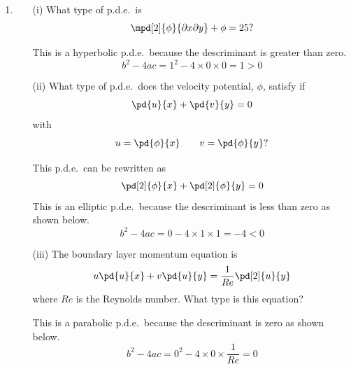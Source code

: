 \documentclass[11pt, oneside]{article}
\begin{document}
\begin{enumerate}
\begin{enumerate}
\begin{center}
        \end{center}
    \end{enumerate}

  \item %
    \begin{enumerate}
      \item[(i)] %
        What type of p.d.e.\ is
        \[
          \mpd[2]{\phi}{\partial x \partial y} + \phi = 25?
        \]

        This is a hyperbolic p.d.e.\ because the descriminant is
        greater than zero.
        \[
          b^2 - 4ac = 1^2 - 4 \times 0 \times 0 = 1 > 0
        \]

      \item[(ii)] %
        What type of p.d.e.\ does the velocity potential, $\phi$, satisfy if
        \[
          \pd{u}{x} + \pd{v}{y} = 0
        \]
        with
        \[
          u = \pd{\phi}{x} \qquad v = \pd{\phi}{y}?
        \]

        This p.d.e.\ can be rewritten as
        \[
          \pd[2]{\phi}{x} + \pd[2]{\phi}{y} = 0
        \]
        This is an elliptic p.d.e.\ because the descriminant is less than zero
        as shown below.
        \[
          b^2 - 4ac = 0 - 4\times 1 \times 1 = -4 < 0
        \]

      \item[(iii)] %
        The boundary layer momentum equation is
        \[
          u \pd{u}{x} + v \pd{u}{y} = \frac{1}{Re} \pd[2]{u}{y}
        \]
        where $Re$ is the Reynolds number.
        What type is this equation?

        This is a parabolic p.d.e.\ because the descriminant is zero as shown
        below.
        \[
          b^2 - 4ac = 0^2 - 4 \times 0 \times \frac{1}{Re} = 0
        \]
    \end{enumerate}
\end{enumerate}
\end{document}
